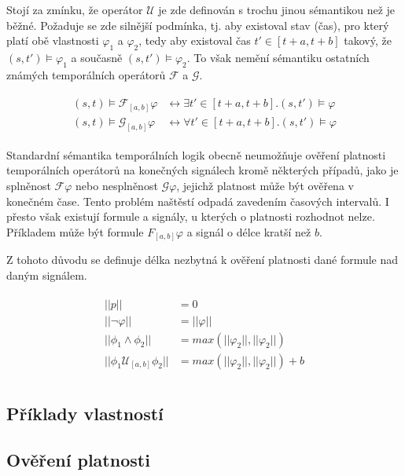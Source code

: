 Stojí za zmínku, že operátor $\mathcal{U}$ je zde definován s trochu jinou sémantikou
než je běžné. Požaduje se zde silnější podmínka, tj. aby existoval stav (čas),
pro který platí obě vlastnosti $\varphi_1$ a $\varphi_2$, tedy aby existoval
čas $t' \in [t + a, t + b]$ takový, že $(s, t') \models \varphi_1$
a současně $(s, t') \models \varphi_2$. To však nemění sémantiku ostatních známých
temporálních operátorů $\mathcal{F}$ a $\mathcal{G}$.

\begin{align}\label{eq:stl:semantics}
\begin{array}{ll}
(s, t) \models \mathcal{F}_{[a,b]}\varphi &\longleftrightarrow	\exists t'\in[t+a, t+b].(s,t') \models \varphi		\\
(s, t) \models \mathcal{G}_{[a,b]}\varphi &\longleftrightarrow	\forall t'\in[t+a, t+b].(s,t') \models \varphi
\end{array}
\end{align}

Standardní sémantika temporálních logik obecně neumožňuje ověření platnosti temporálních operátorů
na konečných signálech kromě některých případů, jako je splněnost $\mathcal{F}\varphi$
nebo nesplněnost $\mathcal{G}\varphi$, jejichž platnost může být ověřena v konečném čase.
Tento problém naštěstí odpadá zavedením časových intervalů. I přesto však existují
formule a signály, u kterých o platnosti rozhodnot nelze. Příkladem může být formule $F_{[a, b]}\varphi$
a signál o délce kratší než $b$.

Z tohoto důvodu se definuje délka nezbytná k ověření platnosti dané formule nad daným signálem.

\begin{align}\label{eq:stl:min:length}
\begin{array}{ll}
||p||									&= 0									\\
||\neg\varphi||							&= ||\varphi||							\\
||\phi_1 \wedge \phi_2||				&= max(||\varphi_2||,||\varphi_2||) 	\\
||\phi_1 \mathcal{U}_{[a,b]} \phi_2||	&= max(||\varphi_2||,||\varphi_2||) + b	\\
\end{array}
\end{align}

\subsection{Příklady vlastností}

\subsection{Ověření platnosti}

